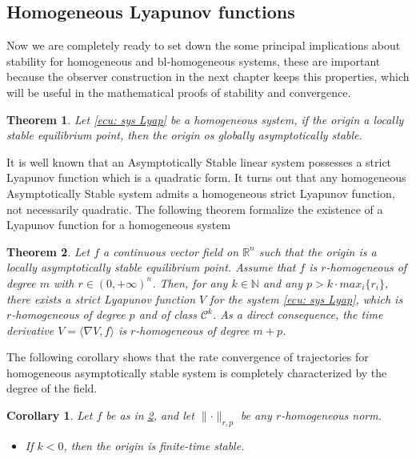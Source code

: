 \documentclass[11pt,letterpaper,twoside,openright]{report}
\newcommand{\RE}{\mathbb{R}}
\providecommand{\norm}[1]{\lVert#1\rVert}
\newtheorem{theorem}{Theorem}[chapter]
\newtheorem{corollary}{Corollary}[chapter]
\begin{document}
\subsection{Homogeneous Lyapunov functions}
Now we are completely ready to set down the some principal implications about stability for homogeneous and bl-homogeneous systems, these are important because the observer construction in the next chapter keeps this properties, which will be useful in the mathematical proofs of stability and convergence. 

\begin{theorem}
	Let \eqref{ecu: sys Lyap} be a homogeneous system, if the origin a locally stable equilibrium point, then the origin os globally asymptotically stable.
\end{theorem}

It is well known that an Asymptotically Stable linear system possesses a strict Lyapunov function which is a quadratic form. It turns out that any homogeneous Asymptotically Stable system admits a homogeneous strict Lyapunov function, not necessarily quadratic. The following theorem formalize the existence of a Lyapunov function for a homogeneous system

\begin{theorem}\label{theo: Hom V}
	\cite{BacciottiAndRosier2005} Let $f$ a continuous vector field on $\RE^n$ such that the origin is a locally asymptotically stable equilibrium point. Assume that $f$ is $r$-homogeneous of degree $m$ with $r \in (0,+\infty)^n$. Then, for any $k\in \mathbb{N}$ and any $p > k\cdot max_i\{r_i\}$, there exists a strict Lyapunov function $V$ for the system \eqref{ecu: sys Lyap}, which is $r$-homogeneous of degree $p$ and of class $\mathcal{C}^k$. As a direct  consequence, the time derivative $V=\langle \nabla V,f \rangle$ is $r$-homogeneous of degree $m+p$.
\end{theorem} 

The following corollary shows that the rate convergence of trajectories for homogeneous asymptotically stable system is completely characterized by the degree of the field.

\begin{corollary}
	Let $f$ be as in \ref{theo: Hom V}, and let $\norm{\cdot}_{r,p}$ be any $r$-homogeneous norm.
	\begin{itemize}
		\item If $k<0$, then the origin is finite-time stable.
	\end{itemize}
\end{corollary}
\end{document}
